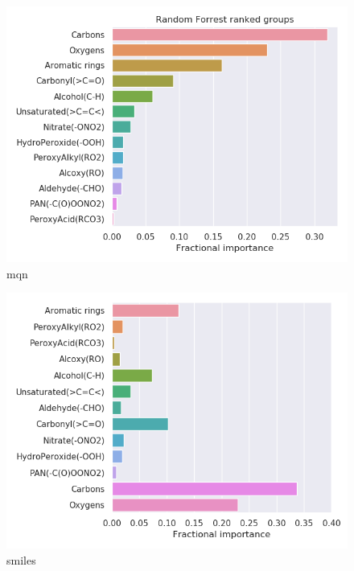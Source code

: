 \begin{subfigure}[b]{0.4\textwidth}
    \centering
    \includegraphics[width=\textwidth]{outputs/AE/mqn/legend.png}
    \caption{mqn}
    \label{fig:legend_AE_mqn}
\end{subfigure}
\begin{subfigure}[b]{0.4\textwidth}
    \centering
    \includegraphics[width=\textwidth]{outputs/AE/smiles/legend.png}
    \caption{smiles}
    \label{fig:legend_AE_smiles}
\end{subfigure}
